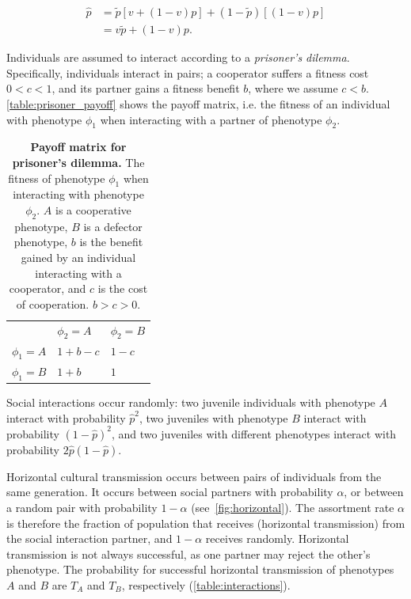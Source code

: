 \documentclass[12pt]{extarticle}
\begin{document}
\begin{equation}\label{eq:horizontal}
\begin{aligned}
\hat{p}
& = \tilde{p} [v + (1-v)p] + (1-\tilde{p}) [(1-v)p] \\
& = v \tilde{p} + (1-v) p.
\end{aligned}
\end{equation}

Individuals are assumed to interact according to a \emph{prisoner's dilemma}.
Specifically, individuals interact in pairs; a cooperator suffers a fitness cost $0<c<1$, and its partner gains a fitness benefit $b$, where we assume $c<b$. \autoref{table:prisoner_payoff} shows the payoff matrix, i.e. the fitness of an individual with phenotype $\phi_1$ when interacting with a partner of phenotype $\phi_2$.

\bigskip
\begin{table}[h]
\centering
\begin{tabular}{lll}
\toprule
           & $\phi_2=A$ & $\phi_2=B$ \\ \cmidrule(r){1-3}
$\phi_1=A$ & $1+b-c$ & $1-c$ \\
$\phi_1=B$ & $1+b$   & $1$
\\ \bottomrule
\end{tabular}
\caption{\textbf{Payoff matrix for prisoner's dilemma.}
The fitness of phenotype $\phi_1$ when interacting with phenotype $\phi_2$. $A$ is a cooperative phenotype, $B$ is a defector phenotype, $b$ is the benefit gained by an individual interacting with a cooperator, and $c$ is the cost of cooperation. $b>c>0$.
}
\label{table:prisoner_payoff}
\end{table}
\bigskip


Social interactions occur randomly:
two juvenile individuals with phenotype $A$ interact with probability $\hat{p}^2$, two juveniles with phenotype $B$ interact with probability $(1-\hat{p})^2$, and two juveniles with different phenotypes interact with probability $2\hat{p}(1-\hat{p})$. 

Horizontal cultural transmission occurs between pairs of individuals from the same generation. 
It occurs between social partners with probability $\alpha$, or between a random pair with probability $1-\alpha$ (see~\autoref{fig:horizontal}).
The assortment rate $\alpha$ is therefore the fraction of population that receives (horizontal transmission) from the social interaction partner, and $1-\alpha$ receives randomly.
Horizontal transmission is not always successful, as one partner may reject the other's phenotype. The probability for successful horizontal transmission of phenotypes $A$ and $B$ are $T_A$ and $T_B$, respectively (\autoref{table:interactions}).
\end{document}
